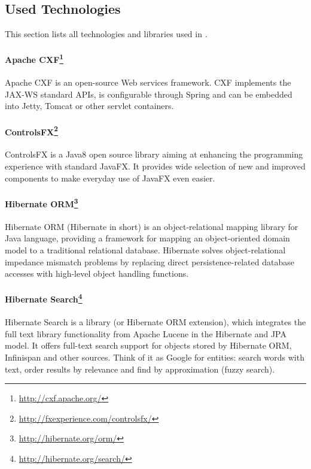 
\subsection{Used Technologies}

This section lists all technologies and libraries used in \textan{}.

\paragraph{Apache CXF\footnote{\url{http://cxf.apache.org/}}}
Apache CXF is an open-source Web services framework. CXF implements the JAX-WS 
standard APIs, is configurable through Spring and can be embedded into Jetty,
Tomcat or other servlet containers.

\paragraph{ControlsFX\footnote{\url{http://fxexperience.com/controlsfx/}}}
ControlsFX is a Java8 open source library aiming at enhancing the programming
experience with standard JavaFX. It provides wide selection of new and improved
components to make everyday use of JavaFX even easier.

\paragraph{Hibernate ORM\footnote{\url{http://hibernate.org/orm/}}}
Hibernate ORM (Hibernate in short) is an object-relational mapping library for
Java language, providing a framework for mapping an object-oriented domain
model to a traditional relational database. Hibernate solves object-relational
impedance mismatch problems by replacing direct persistence-related database
accesses with high-level object handling functions.

\paragraph{Hibernate Search\footnote{\url{http://hibernate.org/search/}}}
Hibernate Search is a library (or Hibernate ORM extension), which integrates
the full text library functionality from Apache Lucene in the Hibernate and
JPA model. It offers full-text search support for objects stored by Hibernate
ORM, Infinispan and other sources. Think of it as Google\texttrademark{} for
entities: search words with text, order results by relevance and find by
approximation (fuzzy search).

